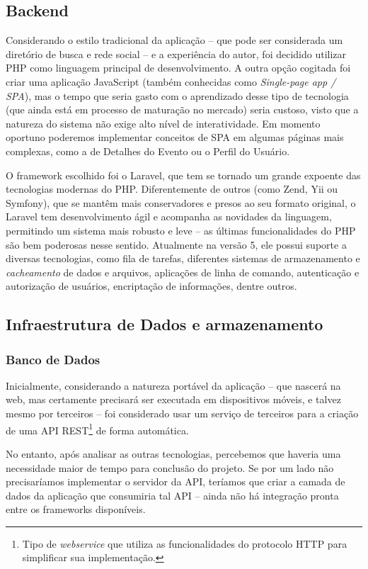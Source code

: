 \documentclass[12pt,a4paper,twoside,hyphens,english,brazil]{abntex2}
\begin{document}
{\subsection{Backend}
Considerando o estilo tradicional da aplicação -- que pode ser considerada um diretório de busca e rede social -- e a experiência do autor, foi decidido utilizar PHP como linguagem principal de desenvolvimento. A outra opção cogitada foi criar uma aplicação JavaScript (também conhecidas como \emph{Single-page app / SPA}\cite{single-page-apps}), mas o tempo que seria gasto com o aprendizado desse tipo de tecnologia (que ainda está em processo de maturação no mercado) seria custoso, visto que a natureza do sistema não exige alto nível de interatividade. Em momento oportuno poderemos implementar conceitos de SPA em algumas páginas mais complexas, como a de Detalhes do Evento ou o Perfil do Usuário.

O framework escolhido foi o Laravel, que tem se tornado um grande expoente das tecnologias modernas do PHP. Diferentemente de outros (como Zend, Yii ou Symfony), que se mantêm mais conservadores e presos ao seu formato original, o Laravel tem desenvolvimento ágil e acompanha as novidades da linguagem, permitindo um sistema mais robusto e leve -- as últimas funcionalidades do PHP são bem poderosas nesse sentido. Atualmente na versão 5, ele possui suporte a diversas tecnologias, como fila de tarefas, diferentes sistemas de armazenamento e \emph{cacheamento} de dados e arquivos, aplicações de linha de comando, autenticação e autorização de usuários, encriptação de informações, dentre outros.\cite{laravel}

\subsection{Infraestrutura de Dados e armazenamento}

\subsubsection{Banco de Dados}
Inicialmente, considerando a natureza portável da aplicação -- que nascerá na web, mas certamente precisará ser executada em dispositivos móveis, e talvez mesmo por terceiros -- foi considerado usar um serviço de terceiros para a criação de uma API REST\footnote{Tipo de \emph{webservice} que utiliza as funcionalidades do protocolo HTTP para simplificar sua implementação.} de forma automática.

No entanto, após analisar as outras tecnologias, percebemos que haveria uma necessidade maior de tempo para conclusão do projeto. Se por um lado não precisaríamos implementar o servidor da API, teríamos que criar a camada de dados da aplicação que consumiria tal API -- ainda não há integração pronta entre os frameworks disponíveis.

}
\end{document}
